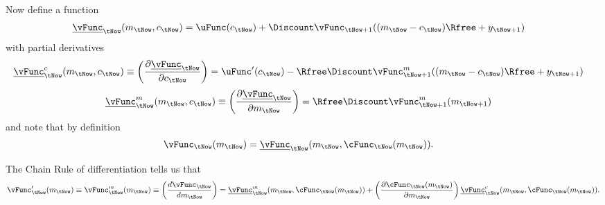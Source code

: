 Now define a function 
\begin{equation}\begin{gathered}\begin{aligned}
        \underline{\vFunc}_{\tNow}({m}_{\tNow},{c}_{\tNow}) & =  \uFunc({c}_{\tNow})+\Discount \vFunc_{\tNow+1}(({m}_{\tNow}-{c}_{\tNow})\Rfree+{y}_{\tNow+1})
\end{aligned}\end{gathered}\end{equation}
with partial derivatives
\begin{equation}\begin{gathered}\begin{aligned}
        \underline{\vFunc}^{c}_{\tNow}({m}_{\tNow},{c}_{\tNow}) \equiv \left(\frac{\partial \underline{\vFunc}_{\tNow}}{\partial {c}_{\tNow}}\right) & =
        \uFunc^{\prime}({c}_{\tNow}) - \Rfree\Discount \vFunc_{\tNow+1}^{m}(({m}_{\tNow}-{c}_{\tNow})\Rfree+{y}_{\tNow+1}) \label{eq:nuc}
\end{aligned}\end{gathered}\end{equation}
\begin{equation}\begin{gathered}\begin{aligned}
      \underline{\vFunc}^{{m}}_{\tNow}({m}_{\tNow},{c}_{\tNow}) \equiv \left(\frac{\partial \underline{\vFunc}_{\tNow}}{\partial {m}_{\tNow}}\right) & =  \Rfree \Discount \vFunc_{\tNow+1}^{{m}}({m}_{\tNow+1}) \label{eq:nuprimevtp1}
\end{aligned}\end{gathered}\end{equation}
and note that by definition
\begin{equation}\begin{gathered}\begin{aligned}
        \vFunc_{\tNow}({m}_{\tNow}) & =  \underline{\vFunc}_{\tNow}({m}_{\tNow},\cFunc_{\tNow}({m}_{\tNow})).
\end{aligned}\end{gathered}\end{equation}

The Chain Rule of differentiation tells us that
\begin{equation}\begin{gathered}\begin{aligned}
        \vFunc^{\prime}_{\tNow}({m}_{\tNow})\equiv \vFunc_{\tNow}^{{m}}({m}_{\tNow}) \equiv \left(\frac{d \vFunc_{\tNow}}{d {m}_{\tNow}}\right) & =  \underline{\vFunc}_{\tNow}^{{m}}({m}_{\tNow},\cFunc_{\tNow}({m}_{\tNow})) + \left(\frac{\partial \cFunc_{\tNow}({m}_{\tNow})}{\partial {m}_{\tNow}}\right)\underline{\vFunc}_{\tNow}^{c}({m}_{\tNow},\cFunc_{\tNow}({m}_{\tNow})). \nonumber
\\ \label{eq:partdiff}
\end{aligned}\end{gathered}\end{equation}

